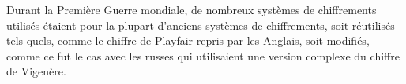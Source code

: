 
Durant la Première Guerre mondiale, de nombreux systèmes de
chiffrements utilisés étaient pour la plupart d'anciens systèmes de
chiffrements, soit réutilisés tels quels, comme le chiffre de Playfair
repris par les Anglais, soit modifiés, comme ce fut le cas
avec les russes qui utilisaient une version complexe du chiffre de
Vigenère.\\

